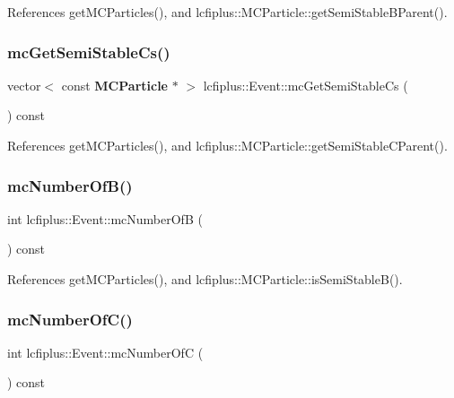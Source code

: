 References get\+M\+C\+Particles(), and lcfiplus\+::\+M\+C\+Particle\+::get\+Semi\+Stable\+B\+Parent().

\mbox{\label{classlcfiplus_1_1Event_a949c601a2283a1f82843edc3ff82b909}} 
\subsubsection{mc\+Get\+Semi\+Stable\+Cs()}
{\footnotesize\ttfamily vector$<$ const \textbf{ M\+C\+Particle} $\ast$ $>$ lcfiplus\+::\+Event\+::mc\+Get\+Semi\+Stable\+Cs (\begin{DoxyParamCaption}{ }\end{DoxyParamCaption}) const}



References get\+M\+C\+Particles(), and lcfiplus\+::\+M\+C\+Particle\+::get\+Semi\+Stable\+C\+Parent().

\mbox{\label{classlcfiplus_1_1Event_a483418f83bcc351c438211747880de02}} 
\subsubsection{mc\+Number\+Of\+B()}
{\footnotesize\ttfamily int lcfiplus\+::\+Event\+::mc\+Number\+OfB (\begin{DoxyParamCaption}{ }\end{DoxyParamCaption}) const}



References get\+M\+C\+Particles(), and lcfiplus\+::\+M\+C\+Particle\+::is\+Semi\+Stable\+B().

\mbox{\label{classlcfiplus_1_1Event_afa93eea370d3db244886dd60129cd085}} 
\subsubsection{mc\+Number\+Of\+C()}
{\footnotesize\ttfamily int lcfiplus\+::\+Event\+::mc\+Number\+OfC (\begin{DoxyParamCaption}{ }\end{DoxyParamCaption}) const}




